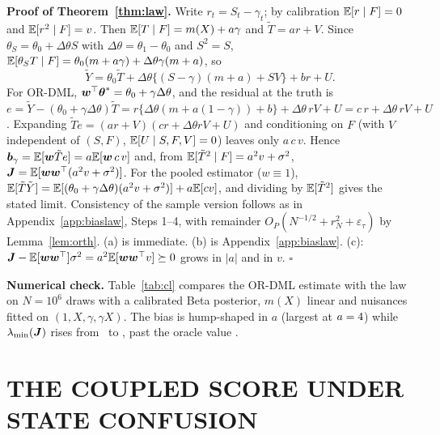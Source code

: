 \textbf{Proof of Theorem~\ref{thm:law}.} Write $r_t=S_t-\gamma_t$; by calibration $\mathbb{E}[r\mid F]=0$ and $\mathbb{E}[r^2\mid F]=v$. Then $\mathbb{E}[T\mid F]=m(X)+a\gamma$ and $\tilde T=ar+V$. Since $\theta_S=\theta_0+\Delta\theta S$ with $\Delta\theta=\theta_1-\theta_0$ and $S^2=S$, $\mathbb{E}[\theta_ST\mid F]=\theta_0(m+a\gamma)+\Delta\theta\gamma(m+a)$, so
\[
\tilde Y=\theta_0\tilde T+\Delta\theta\{(S-\gamma)(m+a)+SV\}+br+U .
\]
For OR-DML, $\boldsymbol w^\top\boldsymbol{\theta}^*=\theta_0+\gamma\Delta\theta$, and the residual at the truth is
$e=\tilde Y-(\theta_0+\gamma\Delta\theta)\tilde T=r\{\Delta\theta(m+a(1-\gamma))+b\}+\Delta\theta\,rV+U=c\,r+\Delta\theta\,rV+U$.
Expanding $\tilde Te=(ar+V)(cr+\Delta\theta rV+U)$ and conditioning on $F$ (with $V$ independent of $(S,F)$, $\mathbb{E}[U\mid S,F,V]=0$) leaves only $a\,c\,v$. Hence $\boldsymbol b_\gamma=\mathbb{E}[\boldsymbol w\tilde Te]=a\mathbb{E}[\boldsymbol w\,c\,v]$ and, from $\mathbb{E}[\tilde T^2\mid F]=a^2v+\sigma^2$, $\boldsymbol{J}=\mathbb{E}[\boldsymbol w\boldsymbol w^\top(a^2v+\sigma^2)]$. For the pooled estimator ($w\equiv1$), $\mathbb{E}[\tilde T\tilde Y]=\mathbb{E}[(\theta_0+\gamma\Delta\theta)(a^2v+\sigma^2)]+a\mathbb{E}[cv]$, and dividing by $\mathbb{E}[\tilde T^2]$ gives the stated limit. Consistency of the sample version follows as in Appendix~\ref{app:biaslaw}, Steps 1--4, with remainder $O_P(N^{-1/2}+r_N^2+\varepsilon_\tau)$ by Lemma~\ref{lem:orth}. (a) is immediate. (b) is Appendix~\ref{app:biaslaw}. (c): $\boldsymbol{J}-\mathbb{E}[\boldsymbol w\boldsymbol w^\top]\sigma^2=a^2\mathbb{E}[\boldsymbol w\boldsymbol w^\top v]\succeq0$ grows in $|a|$ and in $v$. $\square$

\textbf{Numerical check.} Table~\ref{tab:cl} compares the OR-DML estimate with the law on $N=10^6$ draws with a calibrated Beta posterior, $m(X)$ linear and nuisances fitted on $(1,X,\gamma,\gamma X)$. The bias is hump-shaped in $a$ (largest at $a=4$) while $\lambda_{\min}(\boldsymbol{J})$ rises from \CLLamLo\ to \CLLamHi, past the oracle value \CLLamOracle.
\begin{table}[h]\centering\footnotesize
\caption{Residual-state law for posterior-adjusted OR-DML: estimate versus law, true $\bth^*=(0.5,0.5+\Delta\theta)$ (\texttt{reports/synthesis/coupled\_law\_check.csv}).}\label{tab:cl}

\end{table}

\section{THE COUPLED SCORE UNDER STATE CONFUSION}
\label{app:exact}

